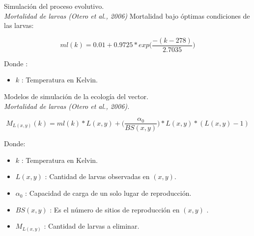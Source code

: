 {
\begin{frame}[c]{Simulación del proceso evolutivo. \\\textit{Mortalidad de larvas (Otero et al., 2006)}}
  Mortalidad bajo óptimas condiciones de las larvas:
  \begin{center}
    \begin{equation}
    \label{eq:mortalidad-natural-larvas}
        ml(k) = 0.01 + 0.9725 * exp\bigg( \frac{-(k - 278)}{2.7035}\bigg)
    \end{equation}
  \end{center}
  Donde :
    \begin{itemize}
      \item $k$ : Temperatura en Kelvin.
    \end{itemize}
\end{frame}

\begin{frame}[c]{Modelos de simulación de la ecología del vector.\\\textit{Mortalidad de larvas (Otero et al., 2006).}}
  \begin{center}
      \begin{equation}
      M_{L(x,y)}(k) = ml(k) * L(x,y) + \bigg(\frac{\alpha _{0}}{BS(x,y)}\bigg) * L(x,y) *(L(x,y) - 1)
    \end{equation}
  \end{center}
  Donde:
 \begin{itemize}
      \item $k$ : Temperatura en Kelvin.
      \item $L(x, y)$ : Cantidad de larvas observadas en $(x,y)$.
      \item $\alpha _{0}$ : Capacidad de carga de un solo lugar de reproducción.
      \item $BS(x,y)$ : Es el número de sitios de reproducción en $(x,y)$ .
      \item $M_{L(x,y)}$ : Cantidad de larvas a eliminar.
    \end{itemize}
\end{frame}
}


